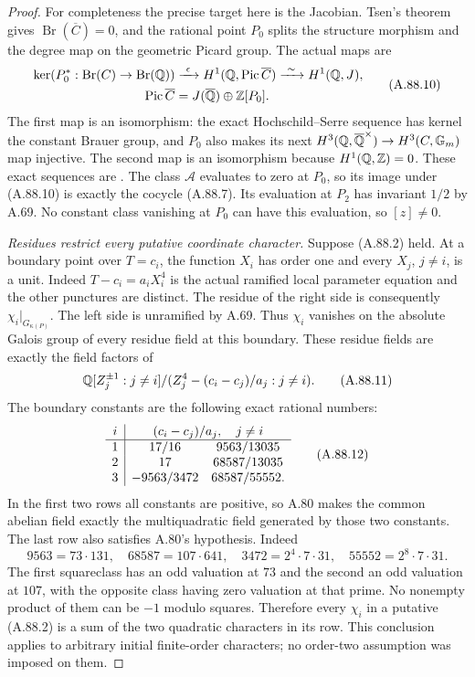 \begin{proof}
For completeness the precise target here is the Jacobian.
Tsen's theorem gives
$\operatorname{Br}(\overline C)=0$, and the rational point
$P_0$ splits the structure morphism and the degree map
on the geometric Picard group.
The actual maps are
\[
 \begin{split}
 \ker\!\left(P_0^*:\operatorname{Br}(C)\to\operatorname{Br}(\mathbb Q)\right)
   &\xrightarrow{\ \epsilon\ }
           H^1(\mathbb Q,\operatorname{Pic}\overline C)
        \xrightarrow{\ \sim\ }H^1(\mathbb Q,J),\\
 \operatorname{Pic}\overline C&=
                   J(\overline{\mathbb Q})\oplus\mathbb Z[P_0].
 \end{split}
 \tag{A.88.10}
\]
The first map is an isomorphism: the exact
Hochschild--Serre sequence has kernel the constant
Brauer group, and $P_0$ also makes its next
$H^3(\mathbb Q,\overline{\mathbb Q}^\times)\to H^3(C,\mathbb G_m)$ map
injective.  The second map is an isomorphism because
$H^1(\mathbb Q,\mathbb Z)=0$.
These exact sequences are
\cite[Proposition 4.3.2, Remark 4.3.3, equation (4.16),
Theorem 4.5.1(ii), and Remark 4.5.2]{AgentCTSkoro2019}.
The class $\mathcal A$ evaluates to zero at $P_0$, so its
image under (A.88.10) is exactly the cocycle (A.88.7).
Its evaluation at $P_2$ has invariant $1/2$ by A.69.
No constant class vanishing at $P_0$ can have this
evaluation, so $[z]\ne0$.

\emph{Residues restrict every putative coordinate character.}
Suppose (A.88.2) held.
At a boundary point over $T=c_i$, the function $X_i$
has order one and every $X_j$, $j\ne i$, is a unit.
Indeed $T-c_i=a_iX_i^4$ is the actual ramified local
parameter equation and the other punctures are distinct.
The residue of the right side is consequently
$\chi_i|_{G_{\kappa(P)}}$.
The left side is unramified by A.69.
Thus $\chi_i$ vanishes on the absolute Galois group of
every residue field at this boundary.
These residue fields are exactly the field factors of
\[
 \mathbb Q[Z_j^{\pm1}:j\ne i]/
                 (Z_j^4-(c_i-c_j)/a_j:j\ne i).
 \tag{A.88.11}
\]
The boundary constants are the following exact rational numbers:
\[
 \begin{array}{c|cc}
 i&\multicolumn{2}{c}{(c_i-c_j)/a_j,\quad j\ne i}\\ \hline
 1&17/16&9563/13035\\
 2&17&68587/13035\\
 3&-9563/3472&68587/55552 .
 \end{array}
 \tag{A.88.12}
\]
In the first two rows all constants are positive, so
A.80 makes the common abelian field exactly the
multiquadratic field generated by those two constants.
The last row also satisfies A.80's hypothesis.
Indeed
\[
 9563=73\cdot131,\quad 68587=107\cdot641,\quad
 3472=2^4\cdot7\cdot31,\quad
 55552=2^8\cdot7\cdot31 .
 \tag{A.88.13}
\]
The first squareclass has an odd valuation at $73$
and the second an odd valuation at $107$, with the
opposite class having zero valuation at that prime.
No nonempty product of them can be $-1$ modulo squares.
Therefore every $\chi_i$ in a putative (A.88.2) is
a sum of the two quadratic characters in its row.
This conclusion applies to arbitrary initial
finite-order characters; no order-two assumption
was imposed on them.


\end{proof}
